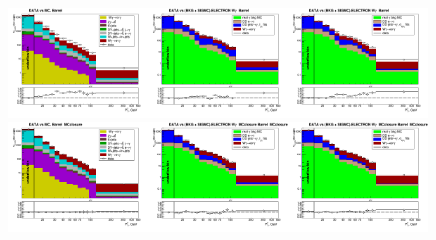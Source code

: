 \begin{figure}[htb]
  \begin{center}
   \includegraphics[width=0.33\textwidth]{../figs/figs_v11/ELECTRON_WGamma/PrepareYields/c_TotalDATAvsMC_Barrel__phoEt.png}\includegraphics[width=0.33\textwidth]{../figs/figs_v11/ELECTRON_WGamma/PrepareYields/c_DATAvsBkgPlusSigMCc_ELECTRON_WGamma_TEMPL_CHISO_UNblind__Barrel__phoEt.png}\includegraphics[width=0.33\textwidth]{../figs/figs_v11/ELECTRON_WGamma/PrepareYields/c_DATAvsBkgPlusSigMCc_ELECTRON_WGamma_TEMPL_SIHIH_UNblind__Barrel__phoEt.png}
   \includegraphics[width=0.33\textwidth]{../figs/figs_v11/ELECTRON_WGamma/PrepareYields/c_TotalDATAvsMC_Barrel__phoEt_MCclosure.png}\includegraphics[width=0.33\textwidth]{../figs/figs_v11/ELECTRON_WGamma/PrepareYields/c_DATAvsBkgPlusSigMCc_ELECTRON_WGamma_TEMPL_CHISO_UNblind_MCclosure__Barrel__phoEt_MCclosure.png}\includegraphics[width=0.33\textwidth]{../figs/figs_v11/ELECTRON_WGamma/PrepareYields/c_DATAvsBkgPlusSigMCc_ELECTRON_WGamma_TEMPL_SIHIH_UNblind_MCclosure__Barrel__phoEt_MCclosure.png}

\end{center}
\end{figure}
